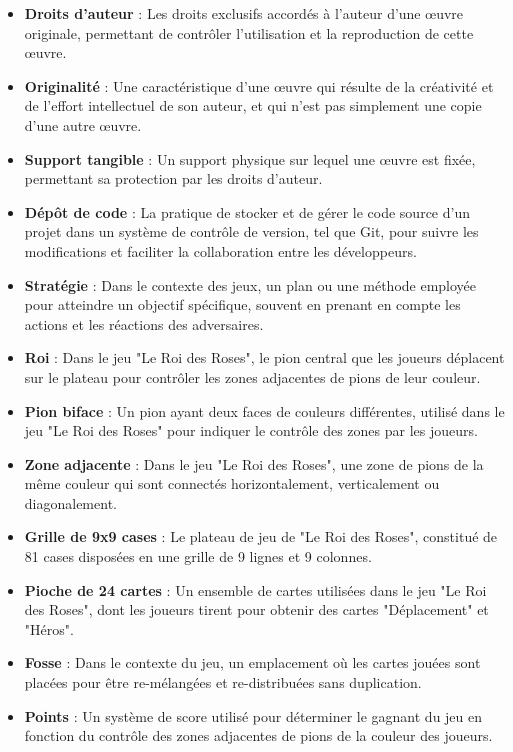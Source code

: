 \begin{itemize}
    \item \textbf{Droits d'auteur} : Les droits exclusifs accordés à l'auteur d'une œuvre originale, permettant de contrôler l'utilisation et la reproduction de cette œuvre.

    \item \textbf{Originalité} : Une caractéristique d'une œuvre qui résulte de la créativité et de l'effort intellectuel de son auteur, et qui n'est pas simplement une copie d'une autre œuvre.

    \item \textbf{Support tangible} : Un support physique sur lequel une œuvre est fixée, permettant sa protection par les droits d'auteur.

    \item \textbf{Dépôt de code} : La pratique de stocker et de gérer le code source d'un projet dans un système de contrôle de version, tel que Git, pour suivre les modifications et faciliter la collaboration entre les développeurs.

    \item \textbf{Stratégie} : Dans le contexte des jeux, un plan ou une méthode employée pour atteindre un objectif spécifique, souvent en prenant en compte les actions et les réactions des adversaires.

    \item \textbf{Roi} : Dans le jeu "Le Roi des Roses", le pion central que les joueurs déplacent sur le plateau pour contrôler les zones adjacentes de pions de leur couleur.

    \item \textbf{Pion biface} : Un pion ayant deux faces de couleurs différentes, utilisé dans le jeu "Le Roi des Roses" pour indiquer le contrôle des zones par les joueurs.

    \item \textbf{Zone adjacente} : Dans le jeu "Le Roi des Roses", une zone de pions de la même couleur qui sont connectés horizontalement, verticalement ou diagonalement.

    \item \textbf{Grille de 9x9 cases} : Le plateau de jeu de "Le Roi des Roses", constitué de 81 cases disposées en une grille de 9 lignes et 9 colonnes.

    \item \textbf{Pioche de 24 cartes} : Un ensemble de cartes utilisées dans le jeu "Le Roi des Roses", dont les joueurs tirent pour obtenir des cartes "Déplacement" et "Héros".

    \item \textbf{Fosse} : Dans le contexte du jeu, un emplacement où les cartes jouées sont placées pour être re-mélangées et re-distribuées sans duplication.

    \item \textbf{Points} : Un système de score utilisé pour déterminer le gagnant du jeu en fonction du contrôle des zones adjacentes de pions de la couleur des joueurs.
\end{itemize}

